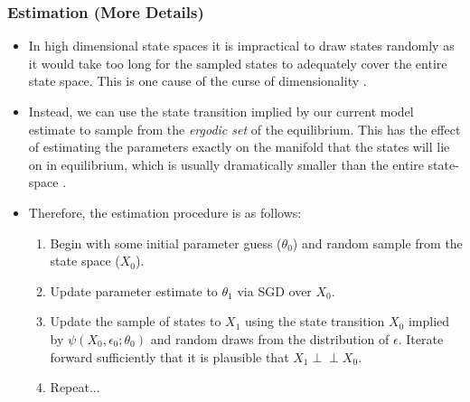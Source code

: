 \documentclass{beamer}
\def\indep{\perp \!\!\! \perp}
\begin{document}
\begin{frame}
    \frametitle{Estimation (More Details)}
    \begin{itemize}
        \item In high dimensional state spaces it is impractical to draw states randomly as it would take too long for the sampled states to adequately cover the entire state space. This is one cause of the curse of dimensionality \parencite{bellman1961curse}.
        \item Instead, we can use the state transition implied by our current model estimate to sample from the \textit{ergodic set} of the equilibrium. This has the effect of estimating the parameters exactly on the manifold that the states will lie on in equilibrium, which is usually dramatically smaller than the entire state-space \parencite{judd2011numerically}.
        \item Therefore, the estimation procedure is as follows:
        \begin{enumerate}
            \item Begin with some initial parameter guess ($\theta_0$) and random sample from the state space ($X_0$). 
            \item Update parameter estimate to $\theta_1$ via SGD over $X_0$.
            \item Update the sample of states to $X_1$ using the state transition $X_0$ implied by $\psi(X_0, \epsilon_0; \theta_0)$ and random draws from the distribution of $\epsilon$. Iterate forward sufficiently that it is plausible that $X_1 \indep X_0$.
            \item Repeat...
        \end{enumerate}
    \end{itemize}
\end{frame}
\end{document}
